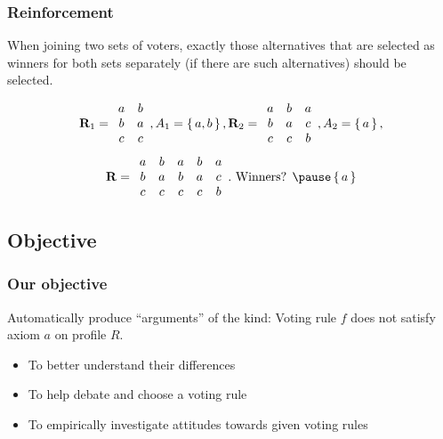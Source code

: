 \documentclass[french,english]{beamer}
\begin{document}
\begin{frame}
	\frametitle{Reinforcement}
	\begin{definition}[Reinforcement]
		When joining two sets of voters, exactly those alternatives that are selected as winners for both sets separately (if there are such alternatives) should be selected.
	\end{definition}
	\begin{example}
		\begin{equation}
			\mathbf{R}_1 =
			\begin{array}{cc}
				a&b\\
				b&a\\
				c&c\\
			\end{array},
			A_1 = \set{a, b},
			\mathbf{R}_2 =
			\begin{array}{ccc}
				a&b&a\\
				b&a&c\\
				c&c&b\\
			\end{array},
			A_2 = \set{a},
		\end{equation}
		\begin{equation}
			\prof =
			\begin{array}{ccccc}
				a&b&a&b&a\\
				b&a&b&a&c\\
				c&c&c&c&b\\
			\end{array}.
			\text{ Winners? }
			\pause
			\set{a}
		\end{equation}
	\end{example}
\end{frame}

\subsection{Objective}
\begin{frame}
	\frametitle{Our objective}
	Automatically produce “arguments” of the kind: Voting rule $f$ does not satisfy axiom $a$ on profile $R$.
	\begin{itemize}
		\item To better understand their differences
		\item To help debate and choose a voting rule
		\item To empirically investigate attitudes towards given voting rules
	\end{itemize}
\end{frame}
\end{document}
